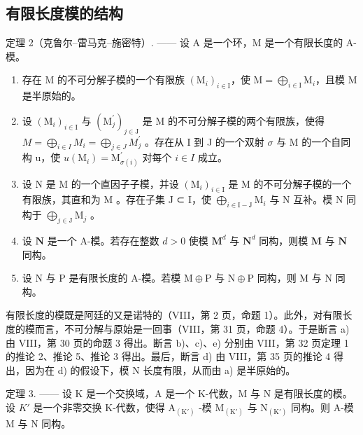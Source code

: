 \subsection{有限长度模的结构}

定理 2（克鲁尔–雷马克–施密特）. —— 设 A 是一个环，M 是一个有限长度的 A-模。

\begin{enumerate}
\def\labelenumi{\alph{enumi})}
\item
  存在 M 的不可分解子模的一个有限族 \((\mathrm{M}_i)_{i\in \mathrm{I}}\)，使 \(\mathrm{M} = \bigoplus_{i\in \mathrm{I}}\mathrm{M}_i\)，且模 M 是半原始的。
\item
  设 \((\mathrm{M}_{i})_{i\in\mathrm{I}}\) 与 \((\mathrm{M}_{j}^{\prime})_{j\in\mathrm{J}}\) 是 M 的不可分解子模的两个有限族，使得 \(M=\bigoplus_{i\in I}M_{i}=\bigoplus_{j\in J}M_{j}^{\prime}\) 。存在从 I 到 J 的一个双射 \(\sigma\) 与 M 的一个自同构 u，使 \(u(\mathrm{M}_{i})=\mathrm{M}_{\sigma(i)}^{\prime}\) 对每个 \(i\in I\) 成立。
\item
  设 \(\mathrm{N}\) 是 \(\mathrm{M}\) 的一个直因子子模，并设 \((\mathrm{M}_i)_{i\in \mathrm{I}}\) 是 \(\mathrm{M}\) 的不可分解子模的一个有限族，其直和为 \(\mathrm{M}\) 。存在子集 \(\mathrm{J}\) ⊂ \(\mathrm{I}\)，使 \(\bigoplus_{i\in \mathrm{I - J}}\mathrm{M}_i\) 与 \(\mathrm{N}\) 互补。模 \(\mathrm{N}\) 同构于 \(\bigoplus_{j\in \mathrm{J}}\mathrm{M}_j\) 。
\item
  设 \(\mathbf{N}\) 是一个 A-模。若存在整数 \(d > 0\) 使模 \(\mathbf{M}^d\) 与 \(\mathbf{N}^d\) 同构，则模 \(\mathbf{M}\) 与 \(\mathbf{N}\) 同构。
\item
  设 \(\mathrm{N}\) 与 \(\mathrm{P}\) 是有限长度的 A-模。若模 \(\mathrm{M} \oplus \mathrm{P}\) 与 \(\mathrm{N} \oplus \mathrm{P}\) 同构，则 \(\mathrm{M}\) 与 \(\mathrm{N}\) 同构。
\end{enumerate}

有限长度的模既是阿廷的又是诺特的（VIII，第 2 页，命题 1）。此外，对有限长度的模而言，不可分解与原始是一回事（VIII，第 31 页，命题 4）。于是断言 a) 由 VIII，第 30 页的命题 3 得出。断言 b)、c)、e) 分别由 VIII，第 32 页定理 1 的推论 2、推论 5、推论 3 得出。最后，断言 d) 由 VIII，第 35 页的推论 4 得出，因为在 d) 的假设下，模 N 长度有限，从而由 a) 是半原始的。

定理 3. —— 设 K 是一个交换域，A 是一个 K-代数，M 与 N 是有限长度的模。设 \(K'\) 是一个非零交换 K-代数，使得 \(\mathrm{A}_{(\mathrm{K}')}\) -模 \(\mathrm{M}_{(\mathrm{K}')}\) 与 \(\mathrm{N}_{(\mathrm{K}')}\) 同构。则 A-模 M 与 N 同构。

